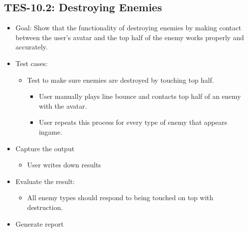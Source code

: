 \subsection{TES-10.2: Destroying Enemies }
\begin{itemize}
\item Goal: Show that the functionality of destroying enemies by making contact between
the user's avatar and the top half of the enemy works properly and accurately.
\item Test cases: 

\begin{itemize}
\item Test to make sure enemies are destroyed by touching top half. 

\begin{itemize}
\item User manually plays line bounce and contacts top half of an enemy with the avatar.
\item User repeats this process for every type of enemy that appears ingame. 
\end{itemize}
\end{itemize}
\item Capture the output 
\begin{itemize}
\item User writes down results
\end{itemize}
\item Evaluate the result: 

\begin{itemize}
\item All enemy types should respond to being touched on top with destruction.
\end{itemize}
\item Generate report 
\end{itemize}

